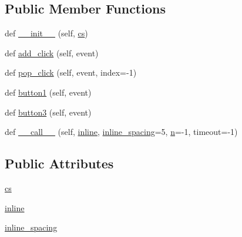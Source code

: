\subsection*{Public Member Functions}
\begin{DoxyCompactItemize}
\item 
def \hyperlink{classmatplotlib_1_1blocking__input_1_1BlockingContourLabeler_a28d9266769b4857cdb0b2b1096037b44}{\+\_\+\+\_\+init\+\_\+\+\_\+} (self, \hyperlink{classmatplotlib_1_1blocking__input_1_1BlockingContourLabeler_aa81b4df9a12c137f26805d3005e5d5f7}{cs})
\item 
def \hyperlink{classmatplotlib_1_1blocking__input_1_1BlockingContourLabeler_aba676b0bf0bae7d45168f384db9d7910}{add\+\_\+click} (self, event)
\item 
def \hyperlink{classmatplotlib_1_1blocking__input_1_1BlockingContourLabeler_a989763d45fd5c4c93d7f5dbe2ff42242}{pop\+\_\+click} (self, event, index=-\/1)
\item 
def \hyperlink{classmatplotlib_1_1blocking__input_1_1BlockingContourLabeler_a72aaa8dfc8029478fea2eb450f4691cb}{button1} (self, event)
\item 
def \hyperlink{classmatplotlib_1_1blocking__input_1_1BlockingContourLabeler_a6678f4e80ead16204389a0b9191c6571}{button3} (self, event)
\item 
def \hyperlink{classmatplotlib_1_1blocking__input_1_1BlockingContourLabeler_aaf8a3e1554765ce3a6c80ea6310269ee}{\+\_\+\+\_\+call\+\_\+\+\_\+} (self, \hyperlink{classmatplotlib_1_1blocking__input_1_1BlockingContourLabeler_a8c595a8be5f9a843247407df66a5d7d1}{inline}, \hyperlink{classmatplotlib_1_1blocking__input_1_1BlockingContourLabeler_a88da4f13847e0b1ebb2f1ded2c09bb93}{inline\+\_\+spacing}=5, \hyperlink{classmatplotlib_1_1blocking__input_1_1BlockingInput_aa532e64cc6bd2af20bbb5c74a35d84c2}{n}=-\/1, timeout=-\/1)
\end{DoxyCompactItemize}
\subsection*{Public Attributes}
\begin{DoxyCompactItemize}
\item 
\hyperlink{classmatplotlib_1_1blocking__input_1_1BlockingContourLabeler_aa81b4df9a12c137f26805d3005e5d5f7}{cs}
\item 
\hyperlink{classmatplotlib_1_1blocking__input_1_1BlockingContourLabeler_a8c595a8be5f9a843247407df66a5d7d1}{inline}
\item 
\hyperlink{classmatplotlib_1_1blocking__input_1_1BlockingContourLabeler_a88da4f13847e0b1ebb2f1ded2c09bb93}{inline\+\_\+spacing}
\end{DoxyCompactItemize}

